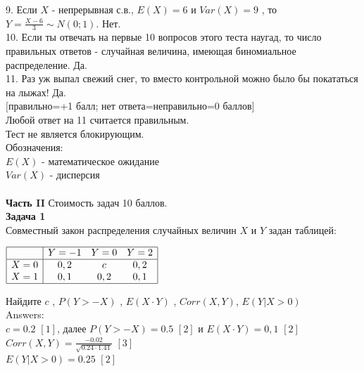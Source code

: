 \documentclass[pdftex,12pt,a4paper]{article}
\begin{document}
9. Если  $X$  - непрерывная с.в.,  $E\left(X\right)=6$  и
$Var\left(X\right)=9$ , то  $Y=\frac{X-6}{3} \sim
N\left(0;1\right)$.  Нет. \\

10. Если ты отвечать на первые 10 вопросов этого теста наугад, то
число правильных ответов - случайная величина, имеющая
биномиальное распределение. Да. \\

11. Раз уж выпал свежий снег, то вместо контрольной можно
было бы покататься на лыжах! Да. \\


$[$правильно=+1 балл; нет ответа=неправильно=0 баллов$]$ \\
Любой ответ на 11 считается правильным. \\
Тест не является блокирующим. \\
Обозначения: \\
$E(X)$ - математическое ожидание \\
$Var(X)$ - дисперсия \\ \\




\pagebreak \textbf{Часть II} Стоимость задач 10 баллов. \\


\textbf{Задача 1} \\ %
Совместный закон распределения случайных величин  $X$  и  $Y$
задан таблицей:

$\begin{array}{|c|ccc|} 
\hline 
{} & {Y=-1} & {Y=0} & {Y=2}\\  
\hline 
{X=0} & {0,2} & {c} & {0,2}\\ 
{X=1} & {0,1} & {0,2} & {0,1} \\  
\hline  
\end{array}$

Найдите  $c$ ,  $P\left(Y>-X\right)$ ,  $E\left(X\cdot Y
\right)$ , $Corr(X,Y)$, $E\left(Y|X>0\right)$ \\
Answers: \\
$c=0.2$ $[1]$, далее $P\left(Y>-X\right)=0.5$ $[2]$ и $E\left(X\cdot Y\right)=0,1$ $[2]$ \\
$Corr(X,Y)=\frac{-0.02}{\sqrt{0.24\cdot 1.41}}$ $[3]$ \\
$E\left(Y|X>0\right)=0.25$ $[2]$ \\
\end{document}
